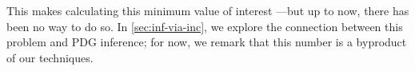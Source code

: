\documentclass{article}
\begin{document}
This makes calculating this minimum value of interest%
---but up to now, there has been no way to do so.
In \cref{sec:inf-via-inc}, we explore the
connection between this problem and PDG inference; 
for now, we remark that this number is a byproduct of our techniques.
\end{document}
